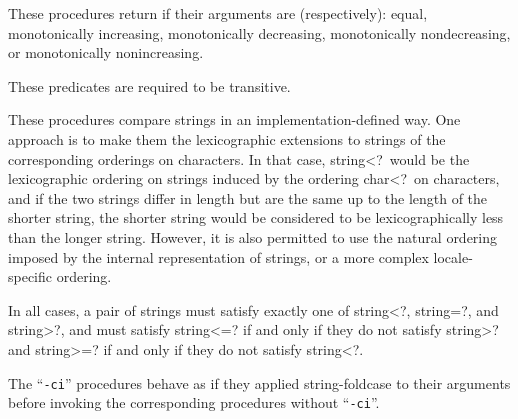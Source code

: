 \begin{entry}{%
}

These procedures return \schtrue{} if their arguments are (respectively):
equal, monotonically increasing, monotonically decreasing,
monotonically nondecreasing, or monotonically nonincreasing.

These predicates are required to be transitive.

These procedures compare strings in an implementation-defined way.
One approach is to make them the lexicographic extensions to strings of
the corresponding orderings on characters.  In that case, {\cf string<?}\
would be the lexicographic ordering on strings induced by the ordering
{\cf char<?}\ on characters, and if the two strings differ in length but
are the same up to the length of the shorter string, the shorter string
would be considered to be lexicographically less than the longer string.
However, it is also permitted to use the natural ordering imposed by the
internal representation of strings, or a more complex locale-specific
ordering.

In all cases, a pair of strings must satisfy exactly one of
{\cf string<?}, {\cf string=?}, and {\cf string>?}, and must satisfy
{\cf string<=?} if and only if they do not satisfy {\cf string>?} and
{\cf string>=?} if and only if they do not satisfy {\cf string<?}.

The \hbox{``{\tt -ci}''} procedures behave as if they applied
{\cf string-foldcase} to their arguments before invoking the corresponding
procedures without  \hbox{``{\tt -ci}''}.


\end{entry}

